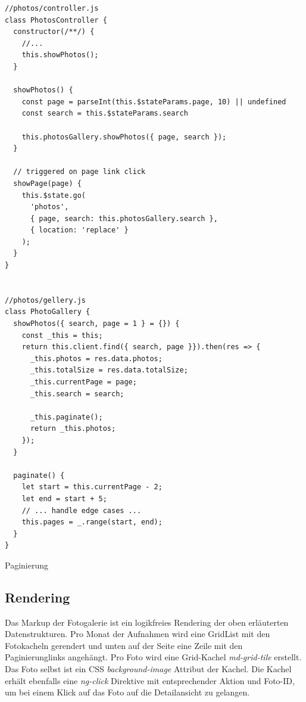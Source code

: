 \begin{listing}[H]
\begin{verbatim}
//photos/controller.js
class PhotosController {
  constructor(/**/) {
    //...
    this.showPhotos();
  }

  showPhotos() {
    const page = parseInt(this.$stateParams.page, 10) || undefined
    const search = this.$stateParams.search

    this.photosGallery.showPhotos({ page, search });
  }

  // triggered on page link click
  showPage(page) {
    this.$state.go(
      'photos',
      { page, search: this.photosGallery.search },
      { location: 'replace' }
    );
  }
}


//photos/gellery.js
class PhotoGallery {
  showPhotos({ search, page = 1 } = {}) {
    const _this = this;
    return this.client.find({ search, page }}).then(res => {
      _this.photos = res.data.photos;
      _this.totalSize = res.data.totalSize;
      _this.currentPage = page;
      _this.search = search;

      _this.paginate();
      return _this.photos;
    });
  }

  paginate() {
    let start = this.currentPage - 2;
    let end = start + 5;
    // ... handle edge cases ...
    this.pages = _.range(start, end);
  }
}

\end{verbatim}
\caption{Paginierung}
\label{lst:pagination}
\end{listing}

\subsection{Rendering}
\label{sec:rendering}

Das Markup der Fotogalerie ist ein logikfreies Rendering der oben erläuterten Datenstrukturen. Pro Monat der Aufnahmen wird eine GridList mit den Fotokacheln gerendert und unten auf der Seite eine Zeile mit den Paginierunglinks angehängt.
Pro Foto wird eine Grid-Kachel \emph{md-grid-tile} erstellt. Das Foto selbst ist ein CSS \emph{background-image} Attribut der Kachel. Die Kachel erhält ebenfalls eine \emph{ng-click} Direktive mit entsprechender Aktion und Foto-ID, um bei einem Klick auf das Foto auf die Detailansicht zu gelangen.

